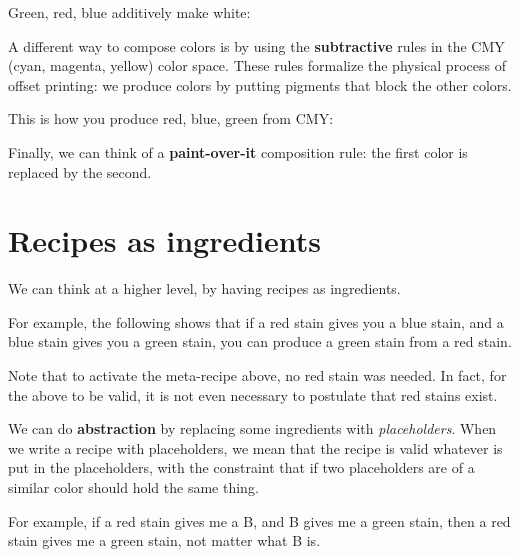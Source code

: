 
Green, red, blue additively make white:


A different way to compose colors is by using the \textbf{subtractive} rules in the CMY (cyan, magenta, yellow) color space.
These rules formalize the physical process of offset printing: we produce colors by putting pigments that block the other colors.


This is how you produce red, blue, green from CMY:


Finally, we can think of a \textbf{paint-over-it} composition rule: the first color is replaced by the second.



\section{Recipes as ingredients}

We can think at a higher level, by having recipes as ingredients.


For example, the following shows that if a red stain gives you a blue stain, and a blue stain gives you a green stain, you can produce a green stain from a red stain.



Note that to activate the meta-recipe above, no red stain was needed.
In fact, for the above to be valid, it is not even necessary to postulate that red stains exist.

We can do \textbf{abstraction} by replacing some ingredients with \emph{placeholders}.
When we write a recipe with placeholders, we mean that the recipe is valid whatever is put in the placeholders, with the constraint that if two placeholders are of a similar color should hold the same thing.

For example, if a red stain gives me a B, and B gives me a green stain, then a red stain gives me a green stain, not matter what B is.

